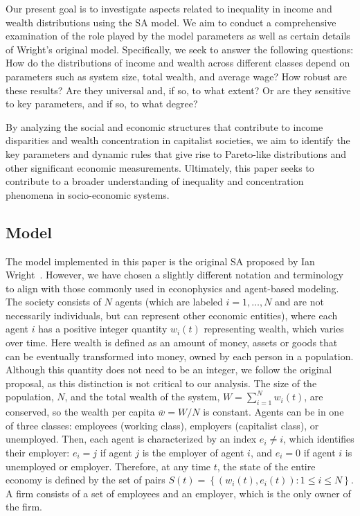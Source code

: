 Our present goal is to investigate aspects related to inequality in income and wealth distributions using the SA model. We aim to conduct a comprehensive examination of the role played by the model parameters as well as certain details of Wright's original model. Specifically, we seek to answer the following questions: How do the distributions of income and wealth across different classes depend on parameters such as system size, total wealth, and average wage? How robust are these results? Are they universal and, if so, to what extent? Or are they sensitive to key parameters, and if so, to what degree?

By analyzing the social and economic structures that contribute to income disparities and wealth concentration in capitalist societies, we aim to identify the key parameters and dynamic rules that give rise to Pareto-like distributions and other significant economic measurements. Ultimately, this paper seeks to contribute to a broader understanding of inequality and concentration phenomena in socio-economic systems.

\subsection{Model}

The model implemented in this paper is the original SA proposed by Ian Wright~\cite{Wright_2005}. However, we have chosen a slightly different notation and terminology to align with those commonly used in econophysics and agent-based modeling. The society consists of $N$ agents (which are labeled $i=1,\dots,N$ and are not necessarily individuals, but can represent other economic entities), where each agent $i$ has a positive integer quantity $w_{i}(t)$ representing wealth, which varies over time. Here wealth is defined as an amount of money, assets or goods that can be eventually transformed into money, owned by each person in a population. Although this quantity does not need to be an integer, we follow the original proposal, as this distinction is not critical to our analysis. The size of the population, $N$, and the total wealth of the system, $W=\sum^{N}_{i=1}w_{i}(t)$, are conserved, so the wealth per capita $\overline{w}=W/N$ is constant. Agents can be in one of three classes: employees (working class), employers (capitalist class), or unemployed. Then, each agent is characterized by an index $e_{i}\neq i$, which identifies their employer: $e_{i}=j$ if agent $j$ is the employer of agent $i$, and $e_{i}=0$ if agent $i$ is unemployed or employer. Therefore, at any time $t$, the state of the entire economy is defined by the set of pairs $S(t)=\left\{ \left(w_{i}(t),e_{i}(t)\right):1\leq i\leq N\right\} $. A firm consists of a set of employees and an employer, which is the only owner of the firm.

